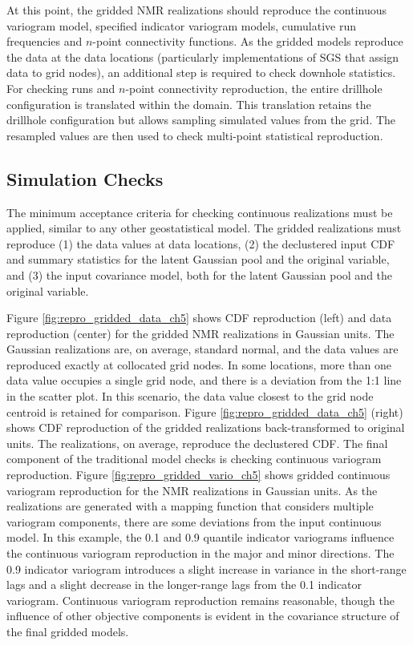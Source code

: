 At this point, the gridded \gls{NMR} realizations should reproduce the continuous variogram model, specified indicator variogram models, cumulative run frequencies and $n$-point connectivity functions. As the gridded models reproduce the data at the data locations (particularly implementations of \gls{SGS} that assign data to grid nodes), an additional step is required to check downhole statistics. For checking runs and $n$-point connectivity reproduction, the entire drillhole configuration is translated within the domain. This translation retains the drillhole configuration but allows sampling simulated values from the grid. The resampled values are then used to check multi-point statistical reproduction.

\FloatBarrier
\subsection{Simulation Checks}
\label{subsec:05simcheck}

The minimum acceptance criteria for checking continuous realizations \citep{leuangthong2004minimum} must be applied, similar to any other geostatistical model. The gridded realizations must reproduce (1) the data values at data locations, (2) the declustered input \gls{CDF} and summary statistics for the latent Gaussian pool and the original variable, and (3) the input covariance model, both for the latent Gaussian pool and the original variable.

Figure \ref{fig:repro_gridded_data_ch5} shows \gls{CDF} reproduction (left) and data reproduction (center) for the gridded \gls{NMR} realizations in Gaussian units. The Gaussian realizations are, on average, standard normal, and the data values are reproduced exactly at collocated grid nodes. In some locations, more than one data value occupies a single grid node, and there is a deviation from the 1:1 line in the scatter plot. In this scenario, the data value closest to the grid node centroid is retained for comparison. Figure \ref{fig:repro_gridded_data_ch5} (right) shows \gls{CDF} reproduction of the gridded realizations back-transformed to original units. The realizations, on average, reproduce the declustered \gls{CDF}. The final component of the traditional model checks is checking continuous variogram reproduction. Figure \ref{fig:repro_gridded_vario_ch5} shows gridded continuous variogram reproduction for the \gls{NMR} realizations in Gaussian units. As the realizations are generated with a mapping function that considers multiple variogram components, there are some deviations from the input continuous model. In this example, the 0.1 and 0.9 quantile indicator variograms influence the continuous variogram reproduction in the major and minor directions. The 0.9 indicator variogram introduces a slight increase in variance in the short-range lags and a slight decrease in the longer-range lags from the 0.1 indicator variogram. Continuous variogram reproduction remains reasonable, though the influence of other objective components is evident in the covariance structure of the final gridded models.

